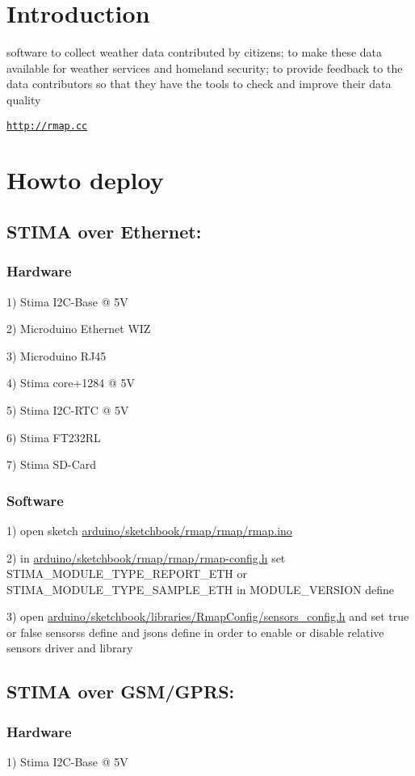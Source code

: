 \hypertarget{index_introduction}{}\section{Introduction}\label{index_introduction}
software to collect weather data contributed by citizens; to make these data available for weather services and homeland security; to provide feedback to the data contributors so that they have the tools to check and improve their data quality

\href{http://rmap.cc}{\tt http\+://rmap.\+cc}\hypertarget{index_howto}{}\section{Howto deploy}\label{index_howto}
\hypertarget{index_stima_ethernet}{}\subsection{S\+T\+I\+M\+A over Ethernet\+:}\label{index_stima_ethernet}
\hypertarget{index_stima_ethernet_hardware}{}\subsubsection{Hardware}\label{index_stima_ethernet_hardware}
1) Stima I2\+C-\/\+Base @ 5V

2) Microduino Ethernet W\+IZ

3) Microduino R\+J45

4) Stima core+1284 @ 5V

5) Stima I2\+C-\/\+R\+TC @ 5V

6) Stima F\+T232\+RL

7) Stima S\+D-\/\+Card\hypertarget{index_stima_ethernet_software}{}\subsubsection{Software}\label{index_stima_ethernet_software}
1) open sketch \hyperlink{rmap_8ino}{arduino/sketchbook/rmap/rmap/rmap.\+ino}

2) in \hyperlink{rmap-config_8h}{arduino/sketchbook/rmap/rmap/rmap-\/config.\+h} set S\+T\+I\+M\+A\+\_\+\+M\+O\+D\+U\+L\+E\+\_\+\+T\+Y\+P\+E\+\_\+\+R\+E\+P\+O\+R\+T\+\_\+\+E\+TH or S\+T\+I\+M\+A\+\_\+\+M\+O\+D\+U\+L\+E\+\_\+\+T\+Y\+P\+E\+\_\+\+S\+A\+M\+P\+L\+E\+\_\+\+E\+TH in M\+O\+D\+U\+L\+E\+\_\+\+V\+E\+R\+S\+I\+ON define

3) open \hyperlink{sensors__config_8h}{arduino/sketchbook/libraries/\+Rmap\+Config/sensors\+\_\+config.\+h} and set true or false sensors\textquotesingle{}s define and json\textquotesingle{}s define in order to enable or disable relative sensor\textquotesingle{}s driver and library\hypertarget{index_stima_gsm}{}\subsection{S\+T\+I\+M\+A over G\+S\+M/\+G\+P\+R\+S\+:}\label{index_stima_gsm}
\hypertarget{index_stima_gsm_hardware}{}\subsubsection{Hardware}\label{index_stima_gsm_hardware}
1) Stima I2\+C-\/\+Base @ 5V

